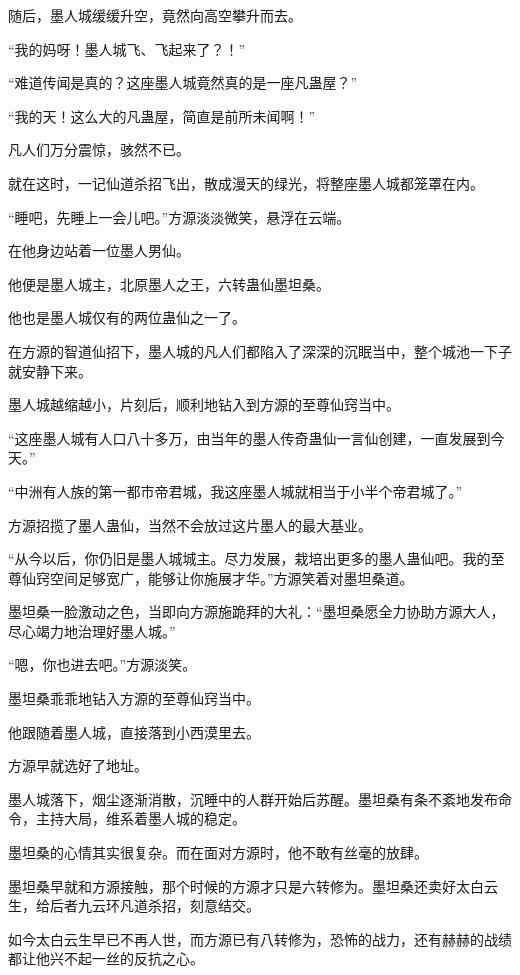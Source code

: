 \begin{this_body}
随后，墨人城缓缓升空，竟然向高空攀升而去。

“我的妈呀！墨人城飞、飞起来了？！”

“难道传闻是真的？这座墨人城竟然真的是一座凡蛊屋？”

“我的天！这么大的凡蛊屋，简直是前所未闻啊！”

凡人们万分震惊，骇然不已。

就在这时，一记仙道杀招飞出，散成漫天的绿光，将整座墨人城都笼罩在内。

“睡吧，先睡上一会儿吧。”方源淡淡微笑，悬浮在云端。

在他身边站着一位墨人男仙。

他便是墨人城主，北原墨人之王，六转蛊仙墨坦桑。

他也是墨人城仅有的两位蛊仙之一了。

在方源的智道仙招下，墨人城的凡人们都陷入了深深的沉眠当中，整个城池一下子就安静下来。

墨人城越缩越小，片刻后，顺利地钻入到方源的至尊仙窍当中。

“这座墨人城有人口八十多万，由当年的墨人传奇蛊仙一言仙创建，一直发展到今天。”

“中洲有人族的第一都市帝君城，我这座墨人城就相当于小半个帝君城了。”

方源招揽了墨人蛊仙，当然不会放过这片墨人的最大基业。

“从今以后，你仍旧是墨人城城主。尽力发展，栽培出更多的墨人蛊仙吧。我的至尊仙窍空间足够宽广，能够让你施展才华。”方源笑着对墨坦桑道。

墨坦桑一脸激动之色，当即向方源施跪拜的大礼：“墨坦桑愿全力协助方源大人，尽心竭力地治理好墨人城。”

“嗯，你也进去吧。”方源淡笑。

墨坦桑乖乖地钻入方源的至尊仙窍当中。

他跟随着墨人城，直接落到小西漠里去。

方源早就选好了地址。

墨人城落下，烟尘逐渐消散，沉睡中的人群开始后苏醒。墨坦桑有条不紊地发布命令，主持大局，维系着墨人城的稳定。

墨坦桑的心情其实很复杂。而在面对方源时，他不敢有丝毫的放肆。

墨坦桑早就和方源接触，那个时候的方源才只是六转修为。墨坦桑还卖好太白云生，给后者九云环凡道杀招，刻意结交。

如今太白云生早已不再人世，而方源已有八转修为，恐怖的战力，还有赫赫的战绩都让他兴不起一丝的反抗之心。


\end{this_body}
